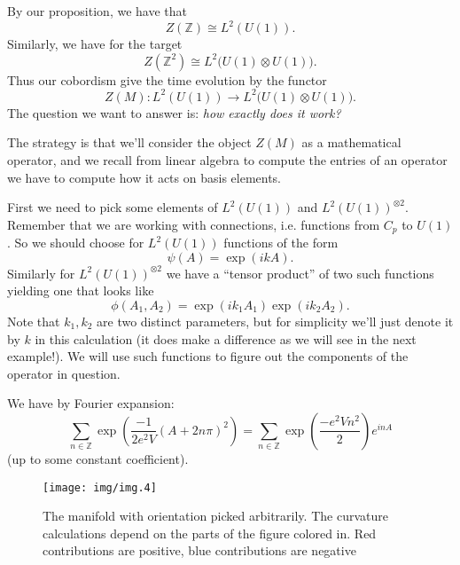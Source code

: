 By our proposition, we have that
\begin{equation}%
Z(\mathbb{Z})\cong L^{2}(U(1)).
\end{equation}
Similarly, we have for the target
\begin{equation}%
Z(\mathbb{Z}^{2})\cong L^{2}\Big(U(1)\otimes U(1)\Big).
\end{equation}
Thus our cobordism give the time evolution by the functor
\begin{equation}%
Z(M): L^{2}(U(1))\to L^{2}\Big(U(1)\otimes U(1)\Big).
\end{equation}
The question we want to answer is: \emph{how exactly does it
  work?}

The strategy is that we'll consider the object $Z(M)$ as a
mathematical operator, and we recall from linear algebra to
compute the entries of an operator we have to compute how it acts
on basis elements. 

First we need to pick some elements of $L^{2}(U(1))$ and
$L^{2}(U(1))^{\otimes 2}$. Remember that we are working
with connections, i.e. functions from $C_{p}$ to $U(1)$. So we
should choose for $L^{2}(U(1))$ functions of the form
\begin{equation}%
\psi(A) = \exp(ikA).
\end{equation}
Similarly for $L^{2}(U(1))^{\otimes 2}$ we have a
``tensor product'' of two such functions yielding one that looks
like
\begin{equation}%
\phi(A_{1},A_{2}) = \exp(ik_{1}A_{1})\exp(ik_{2}A_{2}).
\end{equation}
Note that $k_{1},k_{2}$ are two distinct parameters, but for
simplicity we'll just denote it by $k$ in this calculation (it
does make a difference as we will see in the next example!).
We will use such functions to figure out the components of the
operator in question.

\begin{prop}\label{prop:fourierExpansionThetaFunction}
We have by Fourier expansion:
\begin{equation}%
\sum_{n\in\mathbb{Z}}\exp\left(\frac{-1}{2e^{2}V}(A+2n\pi)^{2}\right)
= \sum_{n\in\mathbb{Z}}\exp\left(\frac{-e^{2}Vn^{2}}{2}\right)e^{inA}
\end{equation}
(up to some constant coefficient).
\end{prop}

\begin{figure}[t]
\texttt{[image: img/img.4]}
\caption{The manifold with orientation picked arbitrarily. The
  curvature calculations depend on the parts of the figure
  colored in. Red contributions are positive, blue contributions
  are negative}\label{fig:img4}
\end{figure}

